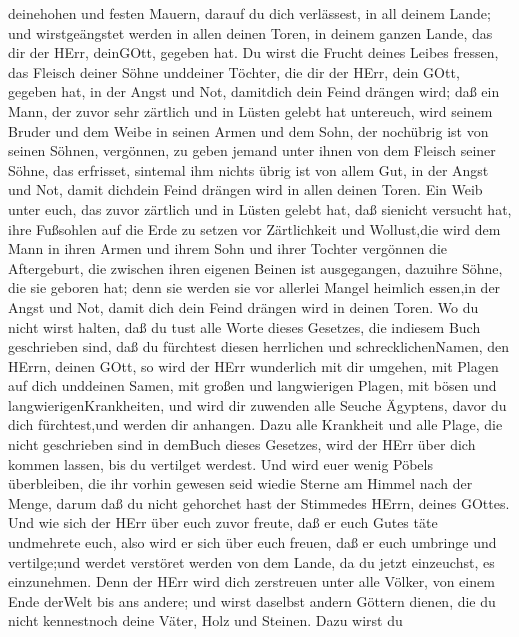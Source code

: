 deinehohen und festen Mauern, darauf du dich verlässest, in all deinem
Lande; und wirstgeängstet werden in allen deinen Toren, in deinem ganzen
Lande, das dir der HErr, deinGOtt, gegeben hat.  Du wirst
die Frucht deines Leibes fressen, das Fleisch deiner Söhne unddeiner
Töchter, die dir der HErr, dein GOtt, gegeben hat, in der Angst und Not,
damitdich dein Feind drängen wird;  daß ein Mann, der zuvor
sehr zärtlich und in Lüsten gelebt hat untereuch, wird seinem Bruder und
dem Weibe in seinen Armen und dem Sohn, der nochübrig ist von seinen
Söhnen, vergönnen,  zu geben jemand unter ihnen von dem
Fleisch seiner Söhne, das erfrisset, sintemal ihm nichts übrig ist von
allem Gut, in der Angst und Not, damit dichdein Feind drängen wird in
allen deinen Toren.  Ein Weib unter euch, das zuvor
zärtlich und in Lüsten gelebt hat, daß sienicht versucht hat, ihre
Fußsohlen auf die Erde zu setzen vor Zärtlichkeit und Wollust,die wird
dem Mann in ihren Armen und ihrem Sohn und ihrer Tochter vergönnen
 die Aftergeburt, die zwischen ihren eigenen Beinen ist
ausgegangen, dazuihre Söhne, die sie geboren hat; denn sie werden sie
vor allerlei Mangel heimlich essen,in der Angst und Not, damit dich dein
Feind drängen wird in deinen Toren.  Wo du nicht wirst
halten, daß du tust alle Worte dieses Gesetzes, die indiesem Buch
geschrieben sind, daß du fürchtest diesen herrlichen und
schrecklichenNamen, den HErrn, deinen GOtt,  so wird der
HErr wunderlich mit dir umgehen, mit Plagen auf dich unddeinen Samen,
mit großen und langwierigen Plagen, mit bösen und
langwierigenKrankheiten,  und wird dir zuwenden alle Seuche
Ägyptens, davor du dich fürchtest,und werden dir anhangen. 
Dazu alle Krankheit und alle Plage, die nicht geschrieben sind in
demBuch dieses Gesetzes, wird der HErr über dich kommen lassen, bis du
vertilget werdest.  Und wird euer wenig Pöbels überbleiben,
die ihr vorhin gewesen seid wiedie Sterne am Himmel nach der Menge,
darum daß du nicht gehorchet hast der Stimmedes HErrn, deines GOttes.
 Und wie sich der HErr über euch zuvor freute, daß er euch
Gutes täte undmehrete euch, also wird er sich über euch freuen, daß er
euch umbringe und vertilge;und werdet verstöret werden von dem Lande, da
du jetzt einzeuchst, es einzunehmen.  Denn der HErr wird
dich zerstreuen unter alle Völker, von einem Ende derWelt bis ans
andere; und wirst daselbst andern Göttern dienen, die du nicht
kennestnoch deine Väter, Holz und Steinen.  Dazu wirst du

